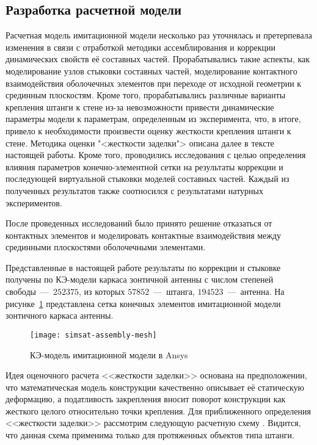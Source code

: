 \subsection{Разработка расчетной модели} \label{struct:simsat-model}

Расчетная модель имитационной модели несколько раз уточнялась и претерпевала изменения в связи с отработкой методики ассемблирования и коррекции динамических свойств её составных частей. Прорабатывались такие аспекты, как моделирование узлов стыковки составных частей, моделирование контактного взаимодействия оболочечных элементов при переходе от исходной геометрии к срединным плоскостям. Кроме того, прорабатывались различные варианты крепления штанги к стене из-за невозможности привести динамические параметры модели к параметрам, определенным из эксперимента, что, в итоге, привело к необходимости произвести оценку жесткости крепления штанги к стене. Методика оценки "<жесткости заделки"> описана далее в тексте настоящей работы. Кроме того, проводились исследования с целью определения влияния параметров конечно-элементной сетки на результаты коррекции и последующей виртуальной стыковки моделей составных частей. Каждый из полученных результатов также соотносился с результатами натурных экспериментов. 

После проведенных исследований было принято решение отказаться от контактных элементов и моделировать контактные взаимодействия между срединными плоскостями оболочечными элементами. 

Представленные в настоящей работе результаты по коррекции и стыковке получены по КЭ-модели каркаса зонтичной  антенны с числом степеней свободы~---~$ 252375 $, из которых $ 57852 $~---~штанга, $ 194523 $~---~антенна. На рисунке~\ref{fig:simsat-assembly-mesh} представлена сетка конечных элементов имитационной модели зонтичного каркаса антенны.

\begin{figure}[!htb]
	\centerfloat
	\texttt{[image: simsat-assembly-mesh]}
	\caption{КЭ-модель имитационной модели в Ansys} \label{fig:simsat-assembly-mesh}
\end{figure}

Идея оценочного расчета <<жесткости заделки>> основана на предположении, что математическая модель конструкции качественно описывает её статическую деформацию, а податливость закрепления вносит поворот конструкции как жесткого целого относительно точки крепления. Для приближенного определения <<жесткости заделки>> рассмотрим следующую расчетную схему . Видится, что данная схема применима только для протяженных объектов типа штанги.

